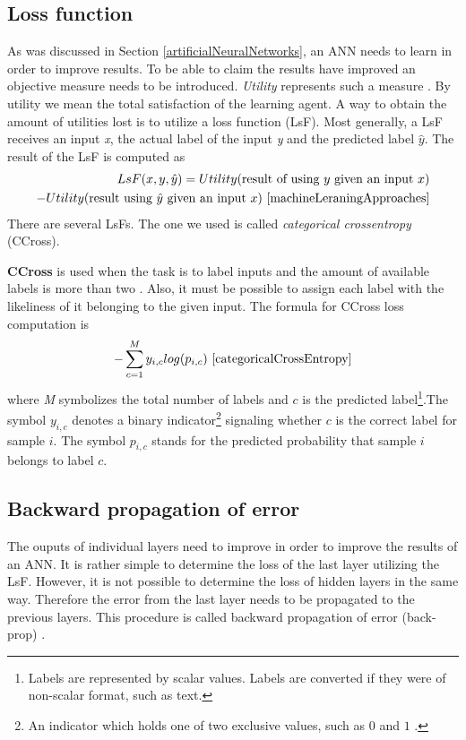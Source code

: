 \subsection{Loss function}\label{lossFunction}
As was discussed in Section \ref{artificialNeuralNetworks}, an ANN needs to learn in order to improve results. To be able to claim the results have improved an objective measure needs to be introduced. \textit{Utility} represents such a measure \cite{machineLeraningApproaches}. By utility we mean the total satisfaction of the learning agent. A way to obtain the amount of utilities lost is to utilize a loss function (LsF). Most generally, a LsF receives an input \textit{x}, the actual label of the input \textit{y} and the predicted label $\hat{y}$. The result of the LsF is computed as
\[
\begin{aligned}
LsF(x, y, \hat{y}) = Utility(\text{result of using }y \text{ given an input }x) \\
- Utility(\text{result using }\hat{y} \text{ given an input }x)~\cite{machineLeraningApproaches}
\end{aligned}
\]
There are several LsFs. The one we used is called \textit{categorical crossentropy} (CCross). 

\textbf{CCross} is used when the task is to label inputs and the amount of available labels is more than two \cite{categoricalCrossEntropy}. Also, it must be possible to assign each label with the likeliness of it belonging to the given input. The formula for CCross loss computation is
\[
-\sum\limits_{c=1}^M y_{i,c} log(p_{i, c})~\cite{categoricalCrossEntropy}
\]
where \textit{M} symbolizes the total number of labels and $c$ is the predicted label\footnote{Labels are represented by scalar values. Labels are converted if they were of non-scalar format, such as text.}.The symbol $y_{i, c}$ denotes a binary indicator\footnote{An indicator which holds one of two exclusive values, such as $0$ and $1$ .} signaling whether $c$ is the correct label for sample $i$. The symbol $p_{i, c}$ stands for the predicted probability that sample $i$ belongs to label $c$. 


\subsection{Backward propagation of error}\label{backpropagation}
The ouputs of individual layers need to improve in order to improve the results of an ANN. It is rather simple to determine the loss of the last layer utilizing the LsF. However, it is not possible to determine the loss of hidden layers in the same way. Therefore the error from the last layer needs to be propagated to the previous layers. This procedure is called backward propagation of error (back-prop) \cite{machineLeraningApproaches}. 

